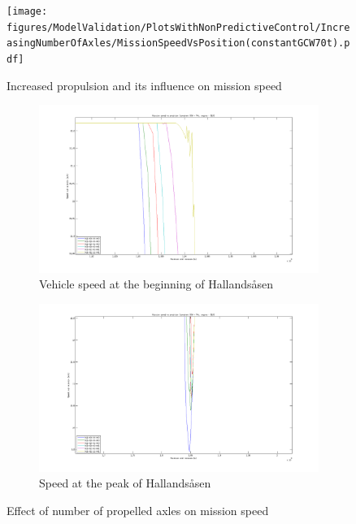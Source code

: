 \documentclass[ExampleMasters.tex]{subfiles}
\begin{document}
\begin{figure}
\centering
\texttt{[image: figures/ModelValidation/PlotsWithNonPredictiveControl/IncreasingNumberOfAxles/MissionSpeedVsPosition(constantGCW70t).pdf]}
\caption{Increased propulsion and its influence on mission speed}
\label{globalMissionSpeedIncreasedPropulsion}
\end{figure}
\begin{figure}
\begin{subfigure}{.5\textwidth}
\centering
\includegraphics[width=\linewidth]{figures/ModelValidation/PlotsWithNonPredictiveControl/IncreasingNumberOfAxles/SpeedVsPositionZoomedNoOfAxlesBeginDec.png}
\caption{Vehicle speed at the beginning of Hallands\aa sen}
\end{subfigure}
\begin{subfigure}{.5\textwidth}
\centering
\includegraphics[width=\linewidth]{figures/ModelValidation/PlotsWithNonPredictiveControl/IncreasingNumberOfAxles/SpeedVsPositionZoomedNoOfAxlesPeak.png}
\caption{Speed at the peak of Hallands\aa sen}
\end{subfigure}
\caption{Effect of number of propelled axles on mission speed}
\label{missionSpeedIncreasedPropulsion}
\end{figure}
\end{document}
